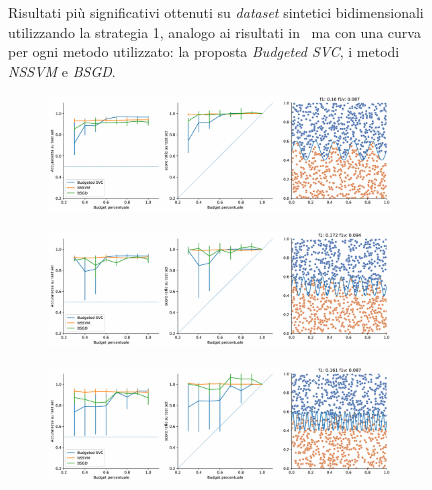 \begin{figure}[b!]
\begin{subfigure}{.9\textwidth}
    \end{subfigure}
    \caption[Risultati su \emph{dataset} sintetici utilizzando strategia 1 in confronto ad altri metodi.]{Risultati più significativi ottenuti su \emph{dataset} sintetici bidimensionali utilizzando la strategia 1, analogo ai risultati in~ ma con una curva per ogni metodo utilizzato: la proposta \emph{Budgeted SVC}, i metodi \emph{NSSVM} e \emph{BSGD}.}
\end{figure}
\begin{figure}[ht]\ContinuedFloat
\centering
    \begin{subfigure}{.9\textwidth}
        \centering
        \includegraphics[width=\textwidth]{img/comp_old/12.pdf}
    \end{subfigure}%
    \hfill
    \begin{subfigure}{.9\textwidth}
        \centering
        \includegraphics[width=\textwidth]{img/comp_old/13.pdf}
    \end{subfigure}
    \hfill
    \begin{subfigure}{.9\textwidth}
        \centering
        \includegraphics[width=\textwidth]{img/comp_old/14.pdf}
    \end{subfigure}

\end{figure}
